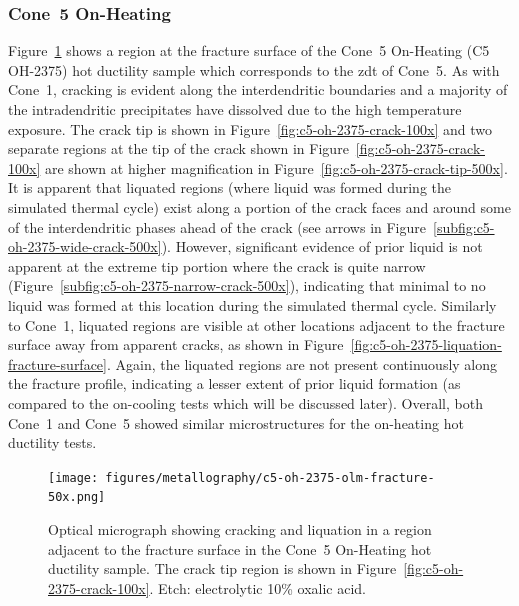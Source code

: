 {\subsubsection{Cone~5 On-Heating}
Figure~\ref{fig:c5-oh-2375-olm-fracture} shows a region at the fracture surface of the Cone~5 On-Heating  (C5 OH-2375) hot ductility sample which corresponds to the \gls{zdt} of Cone~5. As with Cone~1, cracking is evident along the interdendritic boundaries and a majority of the intradendritic precipitates have dissolved due to the high temperature exposure. The crack tip is shown in Figure~\ref{fig:c5-oh-2375-crack-100x} and two separate regions at the tip of the crack shown in Figure~\ref{fig:c5-oh-2375-crack-100x} are shown at higher magnification in Figure~\ref{fig:c5-oh-2375-crack-tip-500x}. It is apparent that liquated regions (where liquid was formed during the simulated thermal cycle) exist along a portion of the crack faces and around some of the interdendritic phases ahead of the crack (see arrows in Figure~\ref{subfig:c5-oh-2375-wide-crack-500x}). However, significant evidence of prior liquid is not apparent at the extreme tip portion where the crack is quite narrow (Figure~\ref{subfig:c5-oh-2375-narrow-crack-500x}), indicating that minimal to no liquid was formed at this location during the simulated thermal cycle. Similarly to Cone~1, liquated regions are visible at other locations adjacent to the fracture surface away from apparent cracks, as shown in Figure~\ref{fig:c5-oh-2375-liquation-fracture-surface}. Again, the liquated regions are not present continuously along the fracture profile, indicating a lesser extent of prior liquid formation (as compared to the on-cooling tests which will be discussed later). Overall, both Cone~1 and Cone~5 showed similar microstructures for the on-heating hot ductility tests.


\begin{figure}
    \centering
    \texttt{[image: figures/metallography/c5-oh-2375-olm-fracture-50x.png]}
    \caption[Optical micrograph showing cracking and liquation in a region adjacent to the fracture surface in the Cone~5 On-Heating \protect{} hot ductility sample.]{Optical micrograph showing cracking and liquation in a region adjacent to the fracture surface in the Cone~5 On-Heating \protect{} hot ductility sample. The crack tip region is shown in Figure~\ref{fig:c5-oh-2375-crack-100x}. Etch: electrolytic 10\% oxalic acid.}
    \label{fig:c5-oh-2375-olm-fracture}
\end{figure}

}
